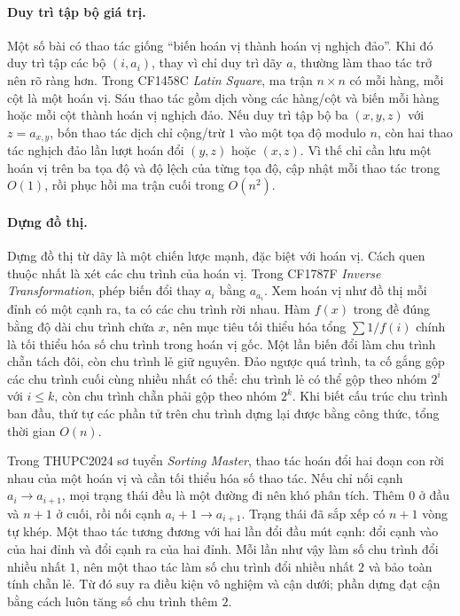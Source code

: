 \documentclass[11pt]{article}
\begin{document}
\paragraph{Duy trì tập bộ giá trị.}
Một số bài có thao tác giống ``biến hoán vị thành hoán vị nghịch đảo''. Khi đó
duy trì tập các bộ \((i,a_i)\), thay vì chỉ duy trì dãy \(a\), thường làm thao
tác trở nên rõ ràng hơn. Trong CF1458C \emph{Latin Square}, ma trận \(n\times n\)
có mỗi hàng, mỗi cột là một hoán vị. Sáu thao tác gồm dịch vòng các hàng/cột và
biến mỗi hàng hoặc mỗi cột thành hoán vị nghịch đảo. Nếu duy trì tập bộ ba
\((x,y,z)\) với \(z=a_{x,y}\), bốn thao tác dịch chỉ cộng/trừ \(1\) vào một tọa
độ modulo \(n\), còn hai thao tác nghịch đảo lần lượt hoán đổi \((y,z)\) hoặc
\((x,z)\). Vì thế chỉ cần lưu một hoán vị trên ba tọa độ và độ lệch của từng
tọa độ, cập nhật mỗi thao tác trong \(O(1)\), rồi phục hồi ma trận cuối trong
\(O(n^2)\).

\paragraph{Dựng đồ thị.}
Dựng đồ thị từ dãy là một chiến lược mạnh, đặc biệt với hoán vị. Cách quen
thuộc nhất là xét các chu trình của hoán vị. Trong CF1787F \emph{Inverse
Transformation}, phép biến đổi thay \(a_i\) bằng \(a_{a_i}\). Xem hoán vị như
đồ thị mỗi đỉnh có một cạnh ra, ta có các chu trình rời nhau. Hàm \(f(x)\)
trong đề đúng bằng độ dài chu trình chứa \(x\), nên mục tiêu tối thiểu hóa tổng
\(\sum 1/f(i)\) chính là tối thiểu hóa số chu trình trong hoán vị gốc. Một lần
biến đổi làm chu trình chẵn tách đôi, còn chu trình lẻ giữ nguyên. Đảo ngược
quá trình, ta cố gắng gộp các chu trình cuối cùng nhiều nhất có thể: chu trình
lẻ có thể gộp theo nhóm \(2^i\) với \(i\le k\), còn chu trình chẵn phải gộp
theo nhóm \(2^k\). Khi biết cấu trúc chu trình ban đầu, thứ tự các phần tử trên
chu trình dựng lại được bằng công thức, tổng thời gian \(O(n)\).

Trong THUPC2024 sơ tuyển \emph{Sorting Master}, thao tác hoán đổi hai đoạn
con rời nhau của một hoán vị và cần tối thiểu hóa số thao tác. Nếu chỉ nối
cạnh \(a_i\to a_{i+1}\), mọi trạng thái đều là một đường đi nên khó phân tích.
Thêm \(0\) ở đầu và \(n+1\) ở cuối, rồi nối cạnh \(a_i+1\to a_{i+1}\). Trạng
thái đã sắp xếp có \(n+1\) vòng tự khép. Một thao tác tương đương với hai lần
đổi đầu mút cạnh: đổi cạnh vào của hai đỉnh và đổi cạnh ra của hai đỉnh. Mỗi
lần như vậy làm số chu trình đổi nhiều nhất \(1\), nên một thao tác làm số chu
trình đổi nhiều nhất \(2\) và bảo toàn tính chẵn lẻ. Từ đó suy ra điều kiện vô
nghiệm và cận dưới; phần dựng đạt cận bằng cách luôn tăng số chu trình thêm
\(2\).
\end{document}

